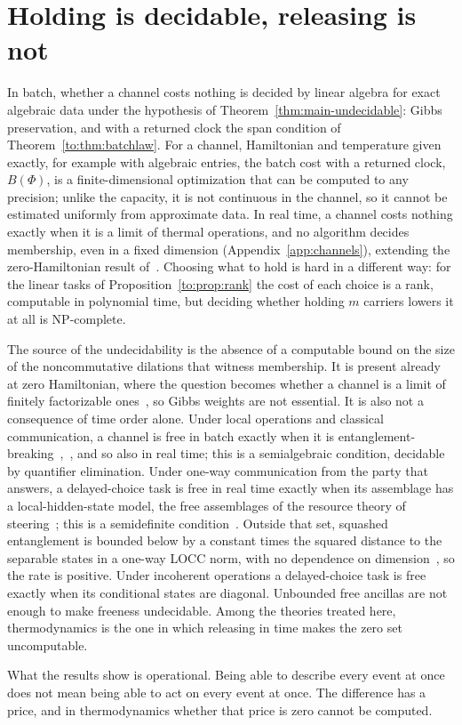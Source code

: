 \section{Holding is decidable, releasing is not}\label{to:sec:computability}

In batch, whether a channel costs nothing is decided by linear algebra for exact algebraic data under the hypothesis of Theorem~\ref{thm:main-undecidable}: Gibbs preservation, and with a returned clock the span condition of Theorem~\ref{to:thm:batchlaw}. For a channel, Hamiltonian and temperature given exactly, for example with algebraic entries, the batch cost with a returned clock, $B(\Phi)$, is a finite-dimensional optimization that can be computed to any precision; unlike the capacity, it is not continuous in the channel, so it cannot be estimated uniformly from approximate data. In real time, a channel costs nothing exactly when it is a limit of thermal operations, and no algorithm decides membership, even in a fixed dimension (Appendix~\ref{app:channels}), extending the zero-Hamiltonian result of~\cite{Flagship}. Choosing what to hold is hard in a different way: for the linear tasks of Proposition~\ref{to:prop:rank} the cost of each choice is a rank, computable in polynomial time, but deciding whether holding $m$ carriers lowers it at all is NP-complete.

The source of the undecidability is the absence of a computable bound on the size of the noncommutative dilations that witness membership. It is present already at zero Hamiltonian, where the question becomes whether a channel is a limit of finitely factorizable ones~\cite{Memory}, so Gibbs weights are not essential. It is also not a consequence of time order alone. Under local operations and classical communication, a channel is free in batch exactly when it is entanglement-breaking~\cite{HSR03},~\cite[Cor.~18]{BBCW13}, and so also in real time; this is a semialgebraic condition, decidable by quantifier elimination. Under one-way communication from the party that answers, a delayed-choice task is free in real time exactly when its assemblage has a local-hidden-state model, the free assemblages of the resource theory of steering~\cite{GallegoAolita15}; this is a semidefinite condition~\cite{CavalcantiSkrzypczyk17}. Outside that set, squashed entanglement is bounded below by a constant times the squared distance to the separable states in a one-way LOCC norm, with no dependence on dimension~\cite{BCY11}, so the rate is positive. Under incoherent operations a delayed-choice task is free exactly when its conditional states are diagonal. Unbounded free ancillas are not enough to make freeness undecidable. Among the theories treated here, thermodynamics is the one in which releasing in time makes the zero set uncomputable.

What the results show is operational. Being able to describe every event at once does not mean being able to act on every event at once. The difference has a price, and in thermodynamics whether that price is zero cannot be computed.

